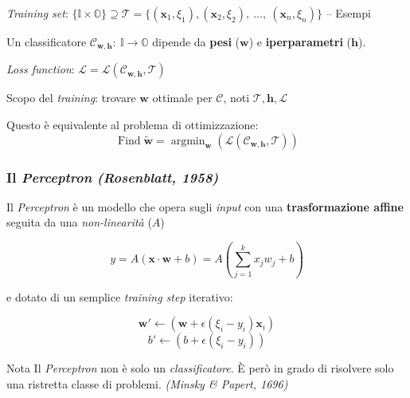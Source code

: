 \documentclass{beamer}
\DeclareMathOperator*{\argmin}{argmin}
\DeclareMathOperator*{\Find}{Find}
\begin{document}
{\begin{frame}
	\textit{Training set}: $\{\mathbb{I}\times\mathbb{O}\} \supseteq \mathcal{T} = \{(\boldsymbol{x}_1, \xi_1), (\boldsymbol{x}_2, \xi_2), \ \dots,\ (\boldsymbol{x}_n, \xi_n)\}$ -- Esempi

	\hfill\break

	Un classificatore $\mathcal{C}_{\boldsymbol{w}, \boldsymbol{h}}: \ \mathbb{I} \rightarrow \mathbb{O}$ dipende da \textbf{pesi} ($\boldsymbol{w}$) e \textbf{iperparametri} ($\boldsymbol{h}$).


	\textit{Loss function}: $\mathcal{L} = \mathcal{L}(\mathcal{C}_{\boldsymbol{w}, \boldsymbol{h}}, \mathcal{T})$

	\hfill\break

	Scopo del \textit{training}: trovare $\boldsymbol{w}$ ottimale per $\mathcal{C}$, noti $\mathcal{T}, \boldsymbol{h}, \mathcal{L}$


	\begin{block}{Questo è equivalente al problema di \alert{ottimizzazione}:}
		$$\Find \boldsymbol{\tilde{w}} = \argmin_{\boldsymbol{w}}\left(\mathcal{L}\left(\mathcal{C}_{\boldsymbol{w}, \boldsymbol{h}}, \mathcal{T}\right)\right)$$
	\end{block}
\end{frame}


\begin{frame}
	\frametitle{Il \textit{Perceptron} \textit{(Rosenblatt, 1958)}}

	Il \textit{Perceptron} è un modello che opera sugli \textit{input} con una \textbf{trasformazione affine} seguita da una \alert{\textit{non-linearità}} ($A$)

	$$
	y = A \left( \boldsymbol{x} \cdot \boldsymbol{w} + b \right) = A \left( \sum_{j=1}^{k}{x_j w_j + b} \right)
	$$

	e dotato di un semplice \textit{training step} iterativo:

	$$
	\boldsymbol{w'} \leftarrow \left( \boldsymbol{w} + \epsilon \left( \xi_i - y_i \right) \boldsymbol{x}_i  \right)
	$$
	$$
	b' \leftarrow \left( b + \epsilon \left( \xi_i - y_i \right) \right)
	$$

	\begin{alertblock}{Nota}
		Il \textit{Perceptron} non è solo un \textit{classificatore}. È però in grado di risolvere solo una ristretta classe di problemi. \textit{(Minsky \& Papert, 1696)}
	\end{alertblock}


\end{frame}}
\end{document}
